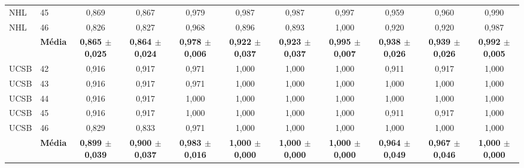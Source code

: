 \begin{table}[H]
{\begin{tabular}{llccccccccc}
NHL & 45 & 0{,}869 & 0{,}867 & 0{,}979 & 0{,}987 & 0{,}987 & 0{,}997 & 0{,}959 & 0{,}960 & 0{,}990 \\
NHL & 46 & 0{,}826 & 0{,}827 & 0{,}968 & 0{,}896 & 0{,}893 & 1{,}000 & 0{,}920 & 0{,}920 & 0{,}987 \\
\cmidrule(lr){2-11}
& \textbf{Média} & \textbf{0{,}865 $\pm$ 0{,}025} & \textbf{0{,}864 $\pm$ 0{,}024} & \textbf{0{,}978 $\pm$ 0{,}006} & \textbf{0{,}922 $\pm$ 0{,}037} & \textbf{0{,}923 $\pm$ 0{,}037} & \textbf{0{,}995 $\pm$ 0{,}007} & \textbf{0{,}938 $\pm$ 0{,}026} & \textbf{0{,}939 $\pm$ 0{,}026} & \textbf{0{,}992 $\pm$ 0{,}005} \\
\midrule
UCSB & 42 & 0{,}916 & 0{,}917 & 0{,}971 & 1{,}000 & 1{,}000 & 1{,}000 & 0{,}911 & 0{,}917 & 1{,}000 \\
UCSB & 43 & 0{,}916 & 0{,}917 & 0{,}971 & 1{,}000 & 1{,}000 & 1{,}000 & 1{,}000 & 1{,}000 & 1{,}000 \\
UCSB & 44 & 0{,}916 & 0{,}917 & 1{,}000 & 1{,}000 & 1{,}000 & 1{,}000 & 1{,}000 & 1{,}000 & 1{,}000 \\
UCSB & 45 & 0{,}916 & 0{,}917 & 1{,}000 & 1{,}000 & 1{,}000 & 1{,}000 & 0{,}911 & 0{,}917 & 1{,}000 \\
UCSB & 46 & 0{,}829 & 0{,}833 & 0{,}971 & 1{,}000 & 1{,}000 & 1{,}000 & 1{,}000 & 1{,}000 & 1{,}000 \\
\cmidrule(lr){2-11}
& \textbf{Média} & \textbf{0{,}899 $\pm$ 0{,}039} & \textbf{0{,}900 $\pm$ 0{,}037} & \textbf{0{,}983 $\pm$ 0{,}016} & \textbf{1{,}000 $\pm$ 0{,}000} & \textbf{1{,}000 $\pm$ 0{,}000} & \textbf{1{,}000 $\pm$ 0{,}000} & \textbf{0{,}964 $\pm$ 0{,}049} & \textbf{0{,}967 $\pm$ 0{,}046} & \textbf{1{,}000 $\pm$ 0{,}000} \\
\bottomrule
\end{tabular}%
}
\end{table}
